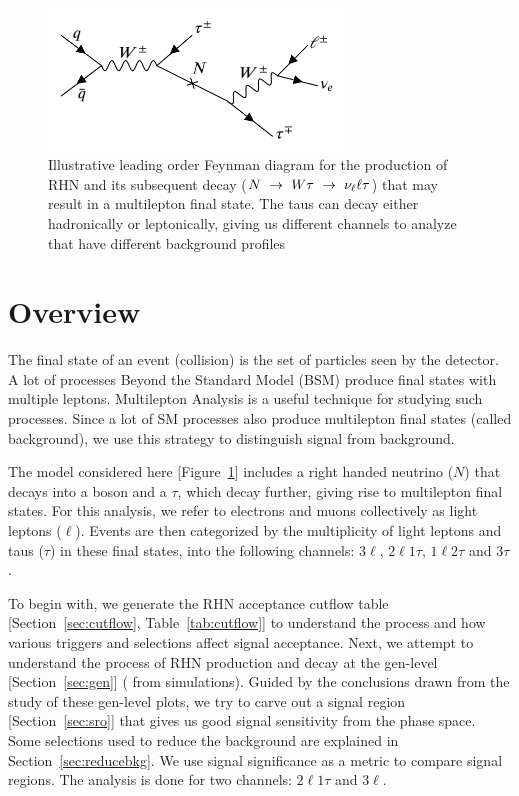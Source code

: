 \documentclass[letterpaper,12pt]{article}
\begin{document}
\begin{figure}[h!]
  \includegraphics[width=0.7\textwidth, center]{images/RHNfeynman.png}
  \caption[RHN Feynman Diagram]{Illustrative leading order Feynman diagram for the production of RHN and its subsequent decay ($N~\rightarrow~W\tau~\rightarrow~\nu_{\ell}\ell\tau$) that may result in a multilepton final state. The taus can decay either hadronically or leptonically, giving us different channels to analyze that have different background profiles}
  \label{fig:rhnfeyn}
\end{figure}

\section{Overview}
\label{sec:overview}

The final state of an event (collision) is the set of particles seen by the detector. A lot of processes Beyond the Standard Model (BSM) produce final states with multiple leptons.  Multilepton Analysis is a useful technique for studying such processes. Since a lot of SM processes also produce multilepton final states (called background), we use this strategy to distinguish signal from background.

The model considered here [Figure~\ref{fig:rhnfeyn}] includes a right handed neutrino ($N$) that decays into a \Wboson{} boson and a $\tau$, which decay further, giving rise to multilepton final states. For this analysis, we refer to electrons and muons collectively as light leptons ($\ell$). Events are then categorized by the multiplicity of light leptons and taus ($\tau$) in these final states, into the following channels: $3\ell$, $2\ell1\tau$, $1\ell2\tau$ and $3\tau$.

To begin with, we generate the RHN acceptance cutflow table [Section~\ref{sec:cutflow}, Table~\ref{tab:cutflow}] to understand the process and how various triggers and selections affect signal acceptance. Next, we attempt to understand the process of RHN production and decay at the gen-level [Section~\ref{sec:gen}] (\ie{} from simulations). Guided by the conclusions drawn from the study of these gen-level plots, we try to carve out a signal region [Section~\ref{sec:sro}] that gives us good signal sensitivity from the phase space. Some selections used to reduce the background are explained in Section~\ref{sec:reducebkg}. We use signal significance as a metric to compare signal regions. The analysis is done for two channels: $2\ell1\tau$ and $3\ell$.
\end{document}
